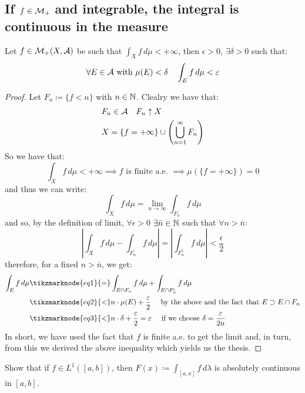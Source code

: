 \subsection{If \texorpdfstring{$f\in\mathcal{M}_+$}{f is measurable} and integrable, the integral is continuous in the measure}\label{int:cont}
Let $f \in \mathcal{M}_+(X, \mathcal{A})$ be such that $\int_X f \, d\mu < +\infty$, then $\epsilon>0$, $\exists \delta > 0$ such that:
\[
    \forall E \in \mathcal{A} \text{ with } \mu(E) < \delta \quad \int_E f \, d\mu < \varepsilon    
\]
\begin{proof}
    Let $F_n \coloneqq \{ f<n \}$ with $n\in\mathbb{N}$. Clealry we have that:
    \begin{align*}
        & F_n \in \A \quad F_n \uparrow X \\%
        & X = \{ f = + \infty \} \cup \left( \bigcup_{n=1}^\infty F_n \right)   
    \end{align*}
    So we have that:
    \[
        \int_X f \, d\mu < + \infty \implies f \text{ is finite a.e. } \implies \mu\left( \{ f = +\infty\}\right) = 0
    \]
    and thus we can write:
    \[
        \int_X f \, d\mu = \lim_{n\to\infty} \int_{F_n} f \, d\mu
    \]
    and so, by the definition of limit, $\forall \epsilon>0$ $\exists \bar{n}\in\mathbb{N}$ such that $\forall n > \bar{n}$:
    \[
        \left| \int_X f \, d\mu - \int_{F_n} f \, d\mu \right| = \left| \int_{F_n^\complement} f \, d\mu \right| < \frac{\epsilon}{2}
    \]
    therefore, for a fixed $n>\bar{n}$, we get:
    \begin{align*}
        \int_E f \, d\mu & \tikzmarknode{eq1}{=} \int_{ E\cap F_n} f\, d\mu + \int_{E \cap F_n^\complement} f \, d\mu \\
        & \tikzmarknode{eq2}{<} n\cdot \mu (E) + \frac{\epsilon}{2} \quad \text{ by the above and the fact that } E \supset E\cap F_n \\
        & \tikzmarknode{eq3}{<} n \cdot \delta + \frac{\epsilon}{2} = \epsilon \quad \text{  if we choose } \delta = \frac{\epsilon}{2n}
    \end{align*}
    In short, we have used the fact that $f$ is finite a.e. to get the limit and, in turn, from this we derived the above inequality which yields us the thesis.
\end{proof}


\question
Show that if $f \in L^1([a, b])$, then $F(x) \coloneqq \int_{[a,x]} f \, d\lambda$ is absolutely continuous in $[a, b]$.

